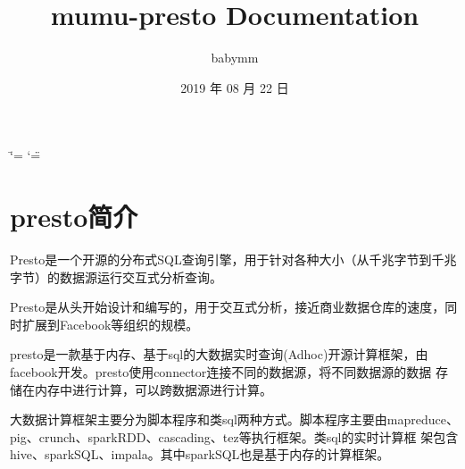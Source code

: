 \documentclass[letterpaper,10pt,english]{sphinxmanual}
\title{mumu-presto Documentation}
\date{2019 年 08 月 22 日}
\author{babymm}
\begin{document}
\ifdefined\shorthandoff
  \ifnum\catcode`\=\string=\active\shorthandoff{=}\fi
  \ifnum\catcode`\"=\active{}\fi
\fi

\pagestyle{empty}
\sphinxmaketitle
\pagestyle{plain}
\sphinxtableofcontents
\pagestyle{normal}
\label{\detokenize{index::doc}}



\chapter{presto简介}
\label{\detokenize{overview:presto}}\label{\detokenize{overview::doc}}
\begin{sphinxVerbatim}[commandchars=\\\{\}]
Presto是一个开源的分布式SQL查询引擎，用于针对各种大小（从千兆字节到千兆字节）的数据源运行交互式分析查询。

Presto是从头开始设计和编写的，用于交互式分析，接近商业数据仓库的速度，同时扩展到Facebook等组织的规模。

presto是一款基于内存、基于sql的大数据实时查询(Ad\PYGZhy{}hoc)开源计算框架，由facebook开发。presto使用connector连接不同的数据源，将不同数据源的数据
存储在内存中进行计算，可以跨数据源进行计算。

大数据计算框架主要分为脚本程序和类sql两种方式。脚本程序主要由mapreduce、pig、crunch、sparkRDD、cascading、tez等执行框架。类sql的实时计算框
架包含hive、sparkSQL、impala。其中sparkSQL也是基于内存的计算框架。
\end{sphinxVerbatim}

\end{document}
